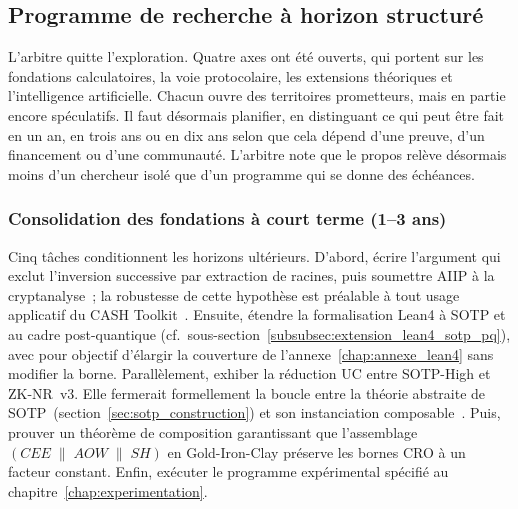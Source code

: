 \subsection{Programme de recherche \`a horizon structur\'e}
\label{subsec:programme_recherche}
\begin{sloppypar}

\begin{boiteArbitre}
L'arbitre quitte l'exploration. Quatre axes ont \'et\'e ouverts, qui portent sur les fondations
calculatoires, la voie protocolaire, les extensions th\'eoriques et l'intelligence
artificielle. Chacun ouvre des territoires prometteurs, mais en partie encore sp\'eculatifs.
Il faut d\'esormais planifier, en distinguant ce qui peut \^etre
fait en un an, en trois ans ou en dix ans selon que cela d\'epend d'une preuve, d'un
financement ou d'une communaut\'e. L'arbitre note que le propos rel\`eve d\'esormais moins d'un
chercheur isol\'e que d'un programme qui se donne des
\'ech\'eances.
\end{boiteArbitre}

\subsubsection{Consolidation des fondations \`a court terme (1--3 ans)}
\label{subsubsec:horizon_court_terme}

Cinq t\^aches conditionnent les horizons ult\'erieurs. D'abord,
\'ecrire l'argument qui exclut l'inversion successive par extraction de
racines, puis soumettre AIIP \`a la cryptanalyse~; la robustesse de cette
hypoth\`ese est pr\'ealable \`a tout usage applicatif du CASH
Toolkit~\cite{MINKA2025AIIP}. Ensuite,
\'etendre la formalisation Lean4 \`a SOTP et au cadre post-quantique
(cf.~sous-section~\ref{subsubsec:extension_lean4_sotp_pq}), avec pour objectif
d'\'elargir la couverture de l'annexe~\ref{chap:annexe_lean4} sans modifier la
borne. Parall\`element,
exhiber la r\'eduction UC entre SOTP-High et ZK-NR~v3. Elle fermerait
formellement la boucle entre la th\'eorie abstraite de
SOTP~(section~\ref{sec:sotp_construction}) et son instanciation
composable~\cite{MINKA2025ZKNR_UC,Canetti01}. Puis, prouver un
th\'eor\`eme de composition garantissant que l'assemblage
$(CEE \;\|\; AOW \;\|\; SH)$ en Gold-Iron-Clay pr\'eserve les bornes CRO
\`a un facteur constant. Enfin, ex\'ecuter le
programme exp\'erimental sp\'ecifi\'e au
chapitre~\ref{chap:experimentation}.


\end{sloppypar}
